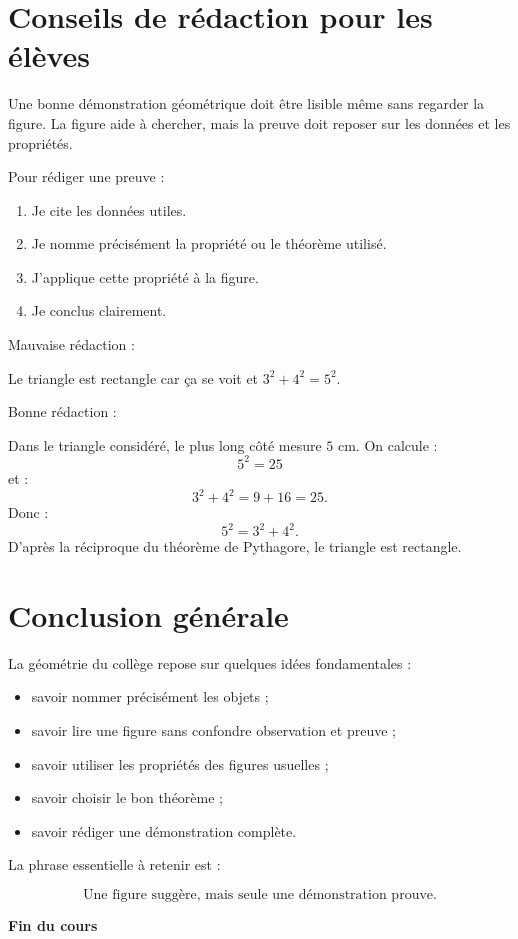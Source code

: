 \documentclass[11pt,a4paper]{article}
\begin{document}
\clearpage
\section{Conseils de rédaction pour les élèves}

\begin{retenirbox}
Une bonne démonstration géométrique doit être lisible même sans regarder la figure. La figure aide à chercher, mais la preuve doit reposer sur les données et les propriétés.
\end{retenirbox}

\begin{methodebox}
Pour rédiger une preuve :
\begin{enumerate}
\item Je cite les données utiles.
\item Je nomme précisément la propriété ou le théorème utilisé.
\item J'applique cette propriété à la figure.
\item Je conclus clairement.
\end{enumerate}
\end{methodebox}

\begin{exemplebox}
Mauvaise rédaction :

\medskip

\og Le triangle est rectangle car ça se voit et $3^2+4^2=5^2$. \fg

\medskip

Bonne rédaction :

\medskip

Dans le triangle considéré, le plus long côté mesure $5$ cm. On calcule :
\[
5^2=25
\]
et :
\[
3^2+4^2=9+16=25.
\]
Donc :
\[
5^2=3^2+4^2.
\]
D'après la réciproque du théorème de Pythagore, le triangle est rectangle.
\end{exemplebox}

\clearpage
\section{Conclusion générale}

La géométrie du collège repose sur quelques idées fondamentales :

\begin{itemize}
\item savoir nommer précisément les objets ;
\item savoir lire une figure sans confondre observation et preuve ;
\item savoir utiliser les propriétés des figures usuelles ;
\item savoir choisir le bon théorème ;
\item savoir rédiger une démonstration complète.
\end{itemize}

\begin{retenirbox}
La phrase essentielle à retenir est :

\[
\text{Une figure suggère, mais seule une démonstration prouve.}
\]
\end{retenirbox}

\begin{center}
\Large\bfseries Fin du cours
\end{center}
\end{document}

